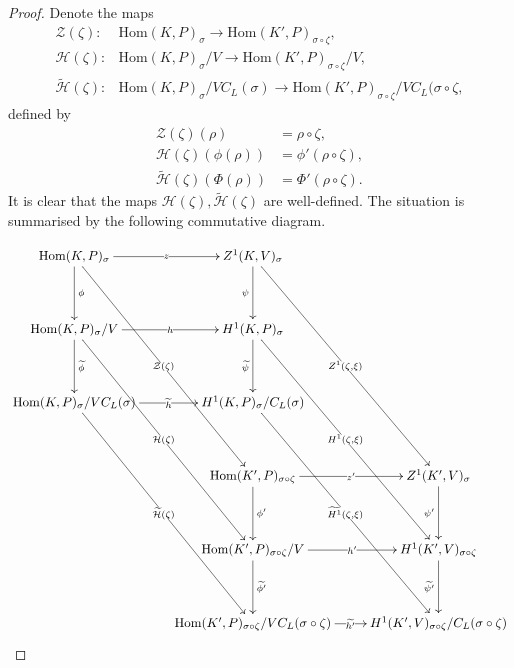 \begin{proof}
	Denote the maps
	\begin{align*}
		\mathcal{Z}(\zeta):&\mathrm{Hom}(K, P)_\sigma \rightarrow \mathrm{Hom}(K', P)_{\sigma\circ\zeta}, \\
		\mathcal{H}(\zeta):&\mathrm{Hom}(K, P)_\sigma/V \rightarrow \mathrm{Hom}(K', P)_{\sigma\circ\zeta}/V, \\
		\widetilde{\mathcal{H}}(\zeta):&\mathrm{Hom}(K, P)_\sigma/VC_L(\sigma) \rightarrow \mathrm{Hom}(K', P)_{\sigma\circ\zeta}/VC_L(\sigma\circ\zeta,
	\end{align*}
	defined by
	\begin{align*}
		\mathcal{Z}(\zeta)(\rho) &= \rho\circ\zeta, \\
		\mathcal{H}(\zeta)(\phi(\rho)) &= \phi'(\rho\circ\zeta), \\
		\widetilde{\mathcal{H}}(\zeta)(\Phi(\rho)) &= \Phi'(\rho\circ\zeta).
	\end{align*}
It is clear that the maps $\mathcal{H}(\zeta), \widetilde{\mathcal{H}}(\zeta)$ are well-defined.
The situation is summarised by the following commutative diagram.
\par\nobreak
	{\small
	\setlength{\abovedisplayskip}{6pt}
	\setlength{\belowdisplayskip}{\abovedisplayskip}
	\setlength{\abovedisplayshortskip}{3pt}
	\setlength{\belowdisplayshortskip}{3pt}
	\begin{align*}
		\xymatrix@R=40pt{
			\mathrm{Hom}(K, P)_\sigma \ar[r]|-{z} \ar[d]^{\phi} \ar[dddr]|-{\mathcal{Z}(\zeta)} & Z^1(K, V)_\sigma \ar[d]_{\psi} \ar[dddr]|-{Z^1(\zeta, \xi)} & \\
			\mathrm{Hom}(K, P)_\sigma/V \ar[r]|-{h} \ar[d]^{\widetilde{\phi}} \ar[dddr]|-{\mathcal{H}(\zeta)} & H^1(K, P)_\sigma \ar[d]_{\widetilde{\psi}} \ar[dddr]|-{H^1(\zeta, \xi)} & \\
			\mathrm{Hom}(K, P)_\sigma/VC_L(\sigma) \ar[r]|-{\widetilde{h}} \ar[dddr]|-{\widetilde{\mathcal{H}}(\zeta)} & H^1(K, P)_\sigma/C_L(\sigma) \ar[dddr]|-{\widetilde{H^1}(\zeta, \xi)} & \\
			& \mathrm{Hom}(K', P)_{\sigma\circ\zeta} \ar[r]|-{z'} \ar[d]^{\phi'} & Z^1(K', V)_\sigma \ar[d]_{\psi'} \\
			& \mathrm{Hom}(K', P)_{\sigma\circ\zeta}/V \ar[r]|-{h'} \ar[d]^{\widetilde{\phi'}} & H^1(K', V)_{\sigma\circ\zeta} \ar[d]_{\widetilde{\psi'}} \\
			& \mathrm{Hom}(K', P)_{\sigma\circ\zeta}/VC_L(\sigma\circ\zeta) \ar[r]|-{\widetilde{h'}} & H^1(K', V)_{\sigma\circ\zeta}/C_L(\sigma\circ\zeta) \\
}
\end{align*}}
\end{proof}
